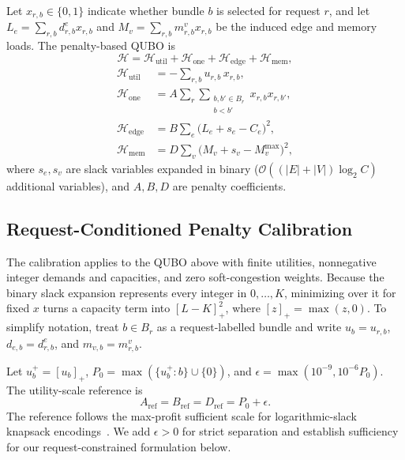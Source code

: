 \documentclass[twocolumn]{article}
\newcommand{\calH}{\mathcal{H}}
\begin{document}
Let $x_{r,b} \in \{0,1\}$ indicate whether bundle $b$ is selected for
request $r$, and let $L_e = \sum_{r,b} d_{r,b}^e x_{r,b}$ and
$M_v = \sum_{r,b} m_{r,b}^v x_{r,b}$ be the induced edge and memory
loads.  The penalty-based QUBO is
\begin{equation}
  \calH = \calH_{\text{util}} + \calH_{\text{one}} + \calH_{\text{edge}} + \calH_{\text{mem}},
  \label{eq:qubo-ham}
\end{equation}
\begin{align}
  \calH_{\text{util}} &= -\sum_{r,b} u_{r,b}\, x_{r,b},\\
  \calH_{\text{one}} &= A \sum_r
    \sum_{\substack{b,b'\in B_r\\b<b'}} x_{r,b}x_{r,b'},\\
  \calH_{\text{edge}} &= B \sum_e \bigl(L_e + s_e - C_e\bigr)^2,\\
  \calH_{\text{mem}} &= D \sum_v \bigl(M_v + s_v - M_v^{\max}\bigr)^2,
\end{align}
where $s_e,s_v$ are slack variables expanded in binary
($\mathcal{O}((|E|+|V|)\log_2 C)$ additional variables), and $A,B,D$
are penalty coefficients.

\subsection{Request-Conditioned Penalty Calibration}
\label{sec:penalty-calibration}

The calibration applies to the QUBO above with finite utilities, nonnegative integer
demands and capacities, and zero soft-congestion weights.  Because the binary
slack expansion represents every integer in $0,\ldots,K$, minimizing over it for 
fixed $x$ turns a capacity term into $[L-K]_+^2$, where $[z]_+=\max(z,0)$.  
To simplify notation, treat $b\in B_r$ as a request-labelled bundle and 
write $u_b=u_{r,b}$, $d_{e,b}=d_{r,b}^e$, and $m_{v,b}=m_{r,b}^v$.

Let $u_b^+=[u_b]_+$,
$P_0=\max(\{u_b^+:b\}\cup\{0\})$, and
$\epsilon=\max(10^{-9},10^{-6}P_0)$.  The utility-scale reference is
\begin{equation}
  A_{\mathrm{ref}}=B_{\mathrm{ref}}=D_{\mathrm{ref}}
  =P_0+\epsilon.
  \label{eq:reference-calibration}
\end{equation}
The reference follows the max-profit sufficient scale for logarithmic-slack 
knapsack encodings~\cite{quintero2021knapsack,guney2025multiknapsack}. 
We add $\epsilon>0$ for strict separation and establish sufficiency for 
our request-constrained formulation below.
\end{document}
